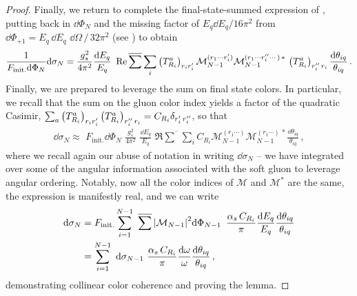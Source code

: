 \begin{proof}
    Finally, we return to complete the final-state-summed expression of , putting back in \(\dd\Phi_N\) and the missing factor of \(E_q \dd E_q / 16\pi^2\) from \(\dd\Phi_{+1} = E_q \, \dd E_q \,\,\dd\Omega\,/\,32\pi^2\) (see ) to obtain
    \begin{align}
        \frac{1}{F_\text{init.} \dd\Phi_N}\dd\sigma_N
        =
        \frac{g_s^2}{4\pi^2}
        \frac{\dd E_q}{E_q}
        \,\,
        \Re
        \overline{\sum}
        \sum_i
        \le(T^a_{R_i}\ri)_{r_i r'_i}
        \mathcal{M}_{N-1}^{(r_1\cdots r'_i)}
        \mathcal{M}_{N-1}^{(r_1\cdots r''_i\cdots )\, *}
        \,
        \le(T^a_{R_i}\ri)\indices{_{r''_i\,r_i}}
        \frac{\dd\theta_{iq}}{\theta_{iq}}
        \,.
    \end{align}
    Finally, we are prepared to leverage the sum on final state colors.
    In particular, we recall that the sum on the gluon color index yields a factor of the quadratic Casimir, \(\sum_a \le(T^a_{R_i}\ri)_{r_i r'_i} \le(T^a_{R_i}\ri)\indices{_{r''_i\,r_i}} = C_{R_i} \delta_{r'_i \, r''_i}\), so that
    \begin{align}
        \dd\sigma_N
        \approx
        \,\,
        F_\text{init.} \dd\Phi_N
        \,\,
        \frac{g_s^2}{4\pi^2}
        \,\,
        \frac{\dd E_q}{E_q}
        \,\,
        \Re
        \overline{\sum}
        \sum_i
        C_{R_i}
        \mathcal{M}_{N-1}^{(r_1\cdots)}
        \mathcal{M}_{N-1}^{(r_1\cdots)\, *}
        \frac{\dd\theta_{iq}}{\theta_{iq}}
        \,,
    \end{align}
    where we recall again our abuse of notation in writing \(\dd\sigma_N\) -- we have integrated over some of the angular information associated with the soft gluon to leverage angular ordering.
    Notably, now all the color indices of \(\mathcal{M}\) and \(\mathcal{M}^*\) are the same, the expression is manifestly real, and we can write
    \begin{align}
        \dd \sigma_N
        &=
        F_\text{init.}
        \sum_{i = 1}^{N-1}
        \,\,
        \overline{\sum}
        \,
        \abs{\mathcal{M}_{N-1}}^2
        \dd\Phi_{N-1}
        \,\,\,
        \frac{\alpha_s\, C_{R_i}}{\pi}
        \frac{\dd E_q}{E_q}
        \frac{\dd \theta_{iq}}{\theta_{iq}}
        \\
        &=
        \sum_{i = 1}^{N-1}
        \,\,
        \dd \sigma_{N-1}
        \,\,
        \frac{\alpha_s\, C_{R_i}}{\pi}
        \frac{\dd \omega}{\omega}
        \frac{\dd \theta_{iq}}{\theta_{iq}}
        \,,
    \end{align}
    demonstrating collinear color coherence and proving the lemma.
\end{proof}



